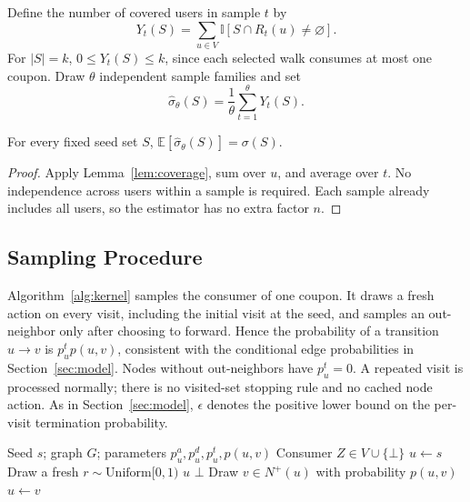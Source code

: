 \documentclass[sigconf]{acmart}
\newcommand{\E}{\mathbb{E}}
\newcommand{\I}{\mathbb{I}}
\begin{document}
Define the number of covered users in sample $t$ by
\[
  Y_t(S)=\sum_{u\in V}\I[S\cap R_t(u)\ne\varnothing].
\]
For $|S|=k$, $0\leq Y_t(S)\leq k$, since each selected walk consumes
at most one coupon. Draw $\theta$ independent sample families and set
\begin{equation}
\label{eq:empirical-spread}
  \hat{\sigma}_{\theta}(S)=\frac1\theta\sum_{t=1}^{\theta}Y_t(S).
\end{equation}

\begin{lemma}[Unbiasedness]
\label{lem:unbiased}
For every fixed seed set $S$,
$\E[\hat{\sigma}_{\theta}(S)]=\sigma(S)$.
\end{lemma}

\begin{proof}
Apply Lemma~\ref{lem:coverage}, sum over $u$, and average over $t$.
No independence across users within a sample is required. Each sample
already includes all users, so the estimator has no extra factor $n$.
\end{proof}

\subsection{Sampling Procedure}

Algorithm~\ref{alg:kernel} samples the consumer of one coupon. It draws
a fresh action on every visit, including the initial visit at the seed,
and samples an out-neighbor only after choosing to forward. Hence the
probability of a transition $u\to v$ is $p_u^t p(u,v)$, consistent
with the conditional edge probabilities in Section~\ref{sec:model}.
Nodes without out-neighbors have $p_u^t=0$. A repeated visit is
processed normally; there is no visited-set stopping rule and no
cached node action. As in Section~\ref{sec:model}, $\epsilon$ denotes
the positive lower bound on the per-visit termination probability.

\begin{algorithm}[t]
\caption{Sample the Consumer of One Coupon}
\label{alg:kernel}
\begin{algorithmic}[1]
\Require Seed $s$; graph $G$; parameters $p_u^a,p_u^d,p_u^t,p(u,v)$
\Ensure Consumer $Z\in V\cup\{\bot\}$
\State $u\gets s$
  \State Draw a fresh $r\sim\mathrm{Uniform}[0,1)$
    \State \Return $u$
    \State \Return $\bot$
  \Else
    \State Draw $v\in N^+(u)$ with probability $p(u,v)$
    \State $u\gets v$
  \EndIf
\EndWhile
\end{algorithmic}
\end{algorithm}
\end{document}
